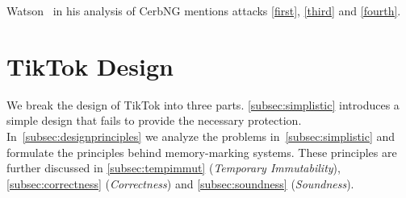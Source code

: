 \documentclass[conference]{IEEEtran}
\newcommand{\pra}[1]{\textcolor{blue}{\textbf{PS:} #1}}
\newcommand{\sysname}{TikTok}
\begin{document}

Watson~\cite{watson2007exploiting} in his analysis of CerbNG mentions attacks
\autoref{first}, \autoref{third} and \autoref{fourth}.

\section{\sysname{} Design}
\label{sec:design}

We break the design of \sysname{} into three parts. \autoref{subsec:simplistic}
introduces a simple design that fails to provide the necessary protection.
In~\autoref{subsec:designprinciples} we analyze the problems
in~\autoref{subsec:simplistic} and formulate the principles behind
memory-marking systems. These principles are further discussed in
\autoref{subsec:tempimmut} (\emph{Temporary Immutability}),
\autoref{subsec:correctness} (\emph{Correctness}) and \autoref{subsec:soundness}
(\emph{Soundness}).



\end{document}
